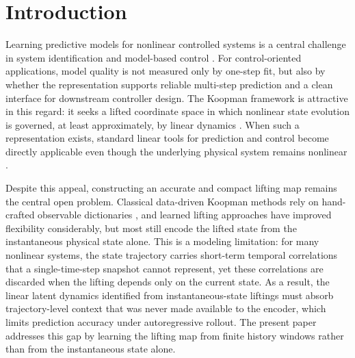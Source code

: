 \documentclass[journal]{IEEEtran}
\begin{document}
\section{Introduction}
\label{sec:introduction}

Learning predictive models for nonlinear controlled systems is a central challenge in system identification and model-based control \cite{ljung1999system, vanoverschee1994n4sid, nelles2020nonlinear}. For control-oriented applications, model quality is not measured only by one-step fit, but also by whether the representation supports reliable multi-step prediction and a clean interface for downstream controller design. The Koopman framework is attractive in this regard: it seeks a lifted coordinate space in which nonlinear state evolution is governed, at least approximately, by linear dynamics \cite{koopman1931hamiltonian, brunton2022modern}. When such a representation exists, standard linear tools for prediction and control become directly applicable even though the underlying physical system remains nonlinear \cite{otto2021koopman, korda2018linear}.

Despite this appeal, constructing an accurate and compact lifting map remains the central open problem. Classical data-driven Koopman methods rely on hand-crafted observable dictionaries \cite{williams2015data, klus2018data}, and learned lifting approaches \cite{lusch2018deep, takeishi2017koopman} have improved flexibility considerably, but most still encode the lifted state from the instantaneous physical state alone. This is a modeling limitation: for many nonlinear systems, the state trajectory carries short-term temporal correlations that a single-time-step snapshot cannot represent, yet these correlations are discarded when the lifting depends only on the current state. As a result, the linear latent dynamics identified from instantaneous-state liftings must absorb trajectory-level context that was never made available to the encoder, which limits prediction accuracy under autoregressive rollout. The present paper addresses this gap by learning the lifting map from finite history windows rather than from the instantaneous state alone.
\end{document}
